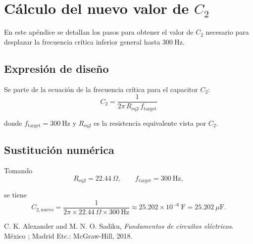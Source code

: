 \documentclass[journal]{IEEEtran}
\begin{document}
\section*{Cálculo del nuevo valor de \(C_2\)}

En este apéndice se detallan los pasos para obtener el valor de \(C_2\) necesario para desplazar la frecuencia crítica inferior general hasta \(300\ \mathrm{Hz}\).

\subsection*{Expresión de diseño}
Se parte de la ecuación de la frecuencia crítica para el capacitor \(C_2\):
\[
C_2
= \frac{1}{2\pi\,R_{\mathrm{eq2}}\,f_{\mathrm{target}}}
\]
\par donde \(f_{\mathrm{target}} = 300\ \mathrm{Hz}\) y \(R_{\mathrm{eq2}}\) es la resistencia equivalente vista por \(C_2\).

\subsection*{Sustitución numérica}
Tomando
\[
R_{\mathrm{eq2}} = 22.44\ \Omega,
\qquad
f_{\mathrm{target}} = 300\ \mathrm{Hz},
\]
\par se tiene
\[
C_{2,\mathrm{nuevo}}
= \frac{1}{2\pi \times 22.44\ \Omega \times 300\ \mathrm{Hz}}
\approx 25.202\times10^{-6}\ \mathrm{F}
= 25.202\ \mu\mathrm{F}.
\]

\ifCLASSOPTIONcaptionsoff
  \newpage
\fi

\begin{thebibliography}{1}
C. K. Alexander and M. N. O. Sadiku, \textit{Fundamentos de circuitos eléctricos}. México ; Madrid Etc.: McGraw-Hill, 2018.
\end{thebibliography}
\end{document}
